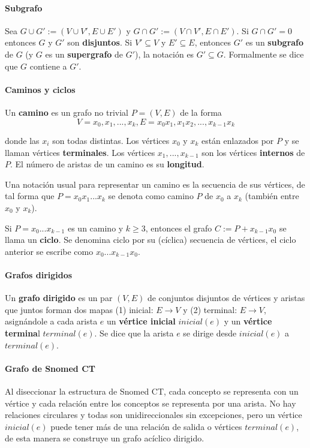\paragraph{Subgrafo}
Sea $G\cup  G':=(V\cup  V', E\cup  E')$ y $G\cap  G':=(V\cap  V', E\cap  E')$. Si $G\cap G' = 0$  entonces $G$ y $G'$ son \textbf{disjuntos}. Si  $V'\subseteq V$ y $E'\subseteq E$, entonces $G'$ es un \textbf{subgrafo} de $G$ (y $G$ es un \textbf{supergrafo} de $G'$), la notación es $G'\subseteq G$. Formalmente se dice que $G$ contiene a $G'$.

\paragraph{Caminos y ciclos}
Un \textbf{camino} es un grafo no trivial $P=(V,E)$ de la forma 
\begin{equation}
V={x_{0},x_{1},...,x_{k}}, E={x_{0}x_{1},x_{1}x_{2},...,x_{k-1}x_{k}}
\end{equation}

donde las $x_{i}$ son todas distintas. Los vértices $x_{0}$ y $x_{k}$ están enlazados por $P$ y se llaman vértices \textbf{terminales}. Los vértices $x_{1},...,x_{k-1}$ son los vértices \textbf{internos} de $P$. El número de aristas de un camino es su \textbf{longitud}.

Una notación usual para representar un camino es la secuencia de sus vértices, de tal forma que $P=x_{0}x_{1}...x_{k}$ se denota como camino $P$ de $x_{0}$ a $x_{k}$ (también entre $x_{0}$ y $x_{k}$).

Si $P=x_{0}...x_{k-1}$ es un camino y $k\geq 3$, entonces el grafo $C:=P+x_{k-1}x_{0}$ se llama un \textbf{ciclo}. Se denomina ciclo por su (cíclica) secuencia de vértices, el ciclo anterior se escribe como $x_{0}...x_{k-1}x_{0}$.

\paragraph{Grafos dirigidos}
Un \textbf{grafo dirigido} es un par $(V,E)$ de conjuntos disjuntos de vértices y aristas que juntos forman dos mapas (1) inicial: $E\rightarrow V$ y (2) terminal: $E\rightarrow V$, asignándole a cada arista $e$ un \textbf{vértice inicial} $inicial(e)$ y un \textbf{vértice termina}l $terminal(e)$. Se dice que la arista $e$ se dirige desde $inicial(e)$ a $terminal(e)$.

\paragraph{Grafo de Snomed CT}
Al diseccionar la estructura de Snomed CT, cada concepto se representa con un vértice y cada relación entre los conceptos se representa por una arista. No hay relaciones circulares y todas son unidireccionales sin excepciones, pero un vértice $inicial(e)$ puede tener más de una relación de salida o vértices $terminal(e)$, de esta manera se construye un grafo acíclico dirigido. \cite{Bhattacharyya2016}

